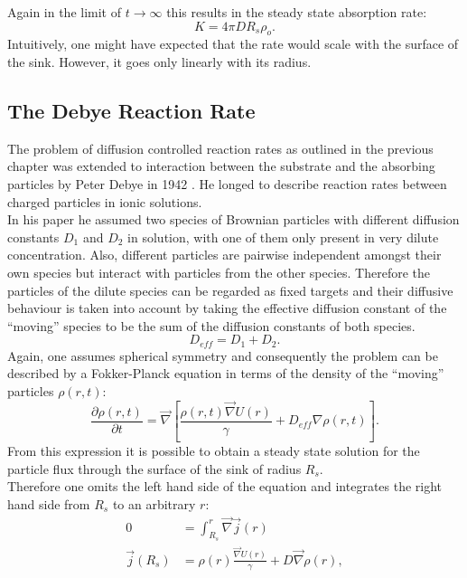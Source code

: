 Again in the limit of $t \rightarrow \infty$ this results in the steady state absorption rate:
\begin{equation}
    K = 4 \pi D R_s \rho_o.
    \label{steady state ideal rate}
\end{equation}
Intuitively, one might have expected that the rate would scale with the surface of the sink. However, it goes only linearly with its radius.
\subsection{The Debye Reaction Rate}
\label{The_Debye_Reaction_Rate}
The problem of diffusion controlled reaction rates as outlined in the previous chapter was extended to interaction between the substrate and the absorbing particles by Peter Debye in 1942 \cite{Debye1942}. He longed to describe reaction rates between charged particles in ionic solutions. \\
In his paper he assumed two species of Brownian particles with different diffusion constants $D_{1}$ and $D_{2}$ in solution, with one of them only present in very dilute concentration. Also, different particles are pairwise independent amongst their own species but interact with particles from the other species. Therefore the particles of the dilute species can be regarded as fixed targets and their diffusive behaviour is taken into account by taking the effective diffusion constant of the ``moving'' species to be the sum of the diffusion constants of both species. 
\begin{equation}
    D_{eff} = D_{1} + D_{2}.
\end{equation}
Again, one assumes spherical symmetry and consequently the problem can be described by a Fokker-Planck equation in terms of the density of the ``moving'' particles $\rho(r,t)$:
\begin{equation}
    \frac{\partial \rho(r,t)}{\partial t} = \vec \nabla \left[ \frac{\rho(r,t)\vec \nabla U(r)}{\gamma} + D_{eff} \nabla \rho(r,t) \right].
    \label{fpe_debye}
\end{equation}
From this expression it is possible to obtain a steady state solution for the particle flux through the surface of the sink of radius $R_s$. \\
Therefore one omits the left hand side of the equation and integrates the right hand side from $R_s$ to an arbitrary $r$:
\begin{align}
    0 &= \int_{R_s}^{r} \vec \nabla \vec j(r) \nonumber \\
    \vec j(R_s) &=  \rho(r)\frac{\vec \nabla U(r)}{\gamma} + D \vec \nabla \rho(r),
\end{align}
